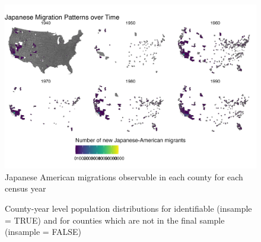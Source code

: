 \documentclass[12pt]{article}
\begin{document}
\begin{figure}
    \centering
    \includegraphics[width=1.0\linewidth]{figures/migrationmap.png}
    \caption{Japanese American migrations observable in each county for each census year}
    \label{fig:migrationmap}
\end{figure}

\label{cell-fig-comparesamplepops}
\begin{figure}
\caption{\label{fig-comparesamplepops}County-year level population
distributions for identifiable (insample = TRUE) and for counties which are not in the final sample (insample = FALSE)}
\end{figure}%
\end{document}
